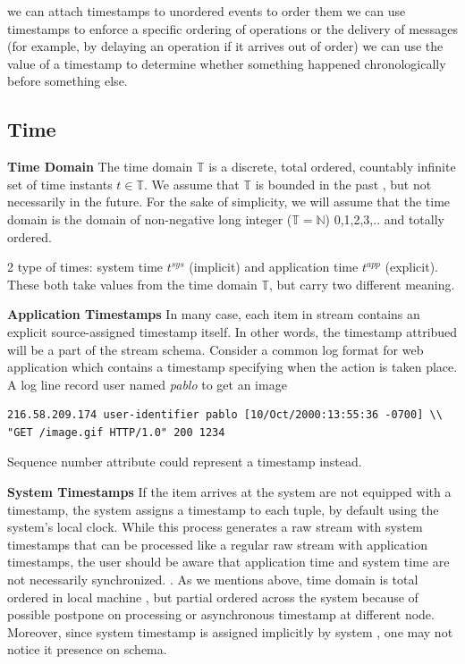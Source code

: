 we can attach timestamps to unordered events to order them
we can use timestamps to enforce a specific ordering of operations or the delivery of messages (for example, by delaying an operation if it arrives out of order)
we can use the value of a timestamp to determine whether something happened chronologically before something else.

\subsection*{Time}
\textbf{Time Domain} The time domain $\mathbb{T}$ is a discrete, total ordered, countably infinite set of time instants $t \in \mathbb{T}$. We assume that $\mathbb{T}$ is bounded in the past , but not necessarily in the future. For the sake of simplicity, we will assume that the time domain is the domain of non-negative long integer ($\mathbb{T} = \mathbb{N}$) {0,1,2,3,..}\citep{Dindar:2013} and totally ordered. 

2 type of times: system time $t^{sys}$ (implicit) and application time $t^{app}$ (explicit). These both take values from the time domain $\mathbb{T}$, but carry two different meaning. 

\textbf{Application Timestamps} In many case, each item in stream contains an explicit source-assigned timestamp itself. In other words, the timestamp attribued will be a part of the stream schema. Consider  a common log format for web application which contains a timestamp specifying when the action is taken place. 
A log line record user named \textit{pablo} to get an image
\begin{verbatim}
216.58.209.174 user-identifier pablo [10/Oct/2000:13:55:36 -0700] \\
"GET /image.gif HTTP/1.0" 200 1234
\end{verbatim}
Sequence number attribute could represent a timestamp instead.

\textbf{System Timestamps} If the item arrives at the system are not equipped with a timestamp, the system assigns a timestamp to each tuple, by default using the system’s local clock. While this process generates a raw stream with system timestamps that can be processed like a regular raw stream with application timestamps, the user should be aware that application time and system time are not necessarily synchronized. \citep{Kramer:2009}. As we mentions above, time domain is total ordered in local machine , but partial ordered across the system because of possible postpone on processing or asynchronous timestamp at different node.
Moreover, since system timestamp is assigned implicitly by system , one may not notice it presence on schema.

